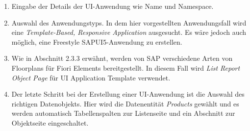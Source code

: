 \begin{enumerate}
\item Eingabe der Details der UI-Anwendung wie Name und Namespace.
\item Auswahl des Anwendungstyps. In dem hier vorgestellten Anwendungsfall wird eine \textit{Template-Based, Responsive Application} ausgesucht. Es wäre jedoch auch möglich, eine Freestyle SAPUI5-Anwendung zu erstellen.
\item Wie in Abschnitt 2.3.3 erwähnt, werden von SAP verschiedene Arten von Floorplans für Fiori Elements bereitgestellt. In diesem Fall wird \textit{List Report Object Page} für UI Application Template verwendet.
\item Der letzte Schritt bei der Erstellung einer UI-Anwendung ist die Auswahl des richtigen Datenobjekts. Hier wird die Datenentität \textit{Products} gewählt und es werden automatisch Tabellenspalten zur Listenseite und ein Abschnitt zur Objektseite eingeschaltet. 
\end{enumerate}



